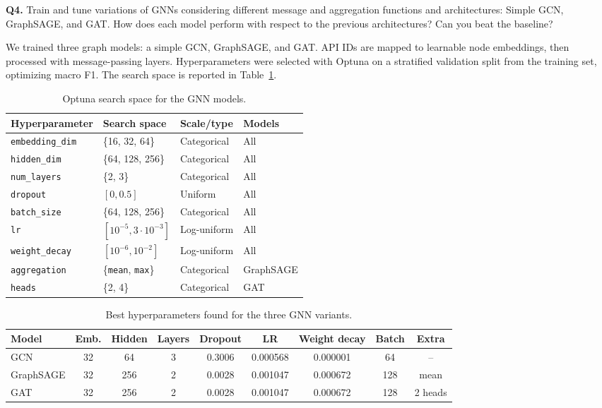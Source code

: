 \begin{questionbox}
\textbf{Q4.} Train and tune variations of GNNs considering different message and aggregation
functions and architectures: Simple GCN, GraphSAGE, and GAT. How does each model perform with
respect to the previous architectures? Can you beat the baseline?
\end{questionbox}

We trained three graph models: a simple GCN, GraphSAGE, and GAT. API IDs are mapped to learnable node
embeddings, then processed with message-passing layers. Hyperparameters were selected with Optuna on
a stratified validation split from the training set, optimizing macro F1. The search space is
reported in Table~\ref{tab:task4_optuna_space}.

\begin{table}[h!]
\centering
\begin{tabular}{llll}
\hline
\textbf{Hyperparameter} & \textbf{Search space} & \textbf{Scale/type} & \textbf{Models} \\
\hline
\texttt{embedding\_dim} & \{16, 32, 64\} & Categorical & All \\
\texttt{hidden\_dim} & \{64, 128, 256\} & Categorical & All \\
\texttt{num\_layers} & \{2, 3\} & Categorical & All \\
\texttt{dropout} & $[0, 0.5]$ & Uniform & All \\
\texttt{batch\_size} & \{64, 128, 256\} & Categorical & All \\
\texttt{lr} & $[10^{-5}, 3 \cdot 10^{-3}]$ & Log-uniform & All \\
\texttt{weight\_decay} & $[10^{-6}, 10^{-2}]$ & Log-uniform & All \\
\texttt{aggregation} & \{\texttt{mean}, \texttt{max}\} & Categorical & GraphSAGE \\
\texttt{heads} & \{2, 4\} & Categorical & GAT \\
\hline
\end{tabular}
\caption{Optuna search space for the GNN models.}
\label{tab:task4_optuna_space}
\end{table}

\begin{table}[h!]
\centering
\begin{tabular}{lcccccccc}
\hline
\textbf{Model} & \textbf{Emb.} & \textbf{Hidden} & \textbf{Layers} & \textbf{Dropout} &
\textbf{LR} & \textbf{Weight decay} & \textbf{Batch} & \textbf{Extra} \\
\hline
GCN       & 32 & 64  & 3 & 0.3006 & 0.000568 & 0.000001 & 64  & -- \\
GraphSAGE & 32 & 256 & 2 & 0.0028 & 0.001047 & 0.000672 & 128 & mean \\
GAT       & 32 & 256 & 2 & 0.0028 & 0.001047 & 0.000672 & 128 & 2 heads \\
\hline
\end{tabular}
\caption{Best hyperparameters found for the three GNN variants.}
\label{tab:task4_best_hyperparameters}
\end{table}

